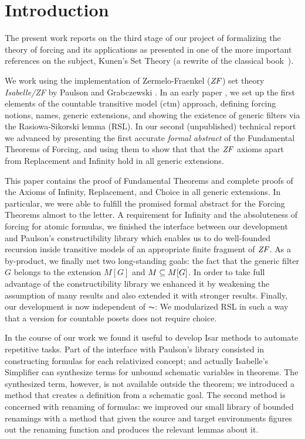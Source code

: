 \section{Introduction}
\label{sec:introduction}

The present work reports on the third stage of our project of
formalizing the theory of forcing and its applications as presented in
one of the more important references on the subject, Kunen's Set
Theory \cite{kunen2011set} (a rewrite of the classical book~\cite{kunen1980}).

We
work using the  implementation of Zermelo-Fraenkel ($\mathit{ZF}$)
set theory \emph{Isabelle/ZF} by Paulson and Grabczewski \cite{DBLP:journals/jar/PaulsonG96}. In
an early paper \cite{2018arXiv180705174G}, we set up the first
elements of the countable transitive model (ctm) approach, defining
forcing notions, names, generic extensions, and
showing the existence of generic filters via the Rasiowa-Sikorski
lemma (RSL). In our second (unpublished) technical report
\cite{2019arXiv190103313G} we advanced by presenting the first accurate
\emph{formal abstract} of the Fundamental Theorems of Forcing, and
using them to show that that the $\mathit{ZF}$ axioms apart from Replacement
and Infinity hold in all generic extensions.

This paper contains the proof of Fundamental Theorems and complete
proofs of the Axioms of Infinity, Replacement, and Choice in all
generic extensions. In particular, we were able to fulfill the
promised formal abstract for the Forcing 
Theorems almost to the letter. A requirement for Infinity and the
absoluteness of forcing for atomic formulas, we finished the interface
between our development and
Paulson's constructibility library \cite{paulson_2003} which enables
us to do well-founded
recursion inside transitive models of an appropriate finite fragment
of $\mathit{ZF}$. As a by-product, we finally met two long-standing goals: the fact that the
generic filter $G$ belongs to the extension $M[G]$ and 
$M\subseteq M[G]$. 
In order to take full advantage of the constructibility library
we enhanced it by weakening the assumption of many results and also
extended it with stronger results. %
Finally, our development is now independent of $\AC$: We modularized
RSL in such a way that a version for countable 
posets does not require choice.

In the course of our work we found it useful to develop Isar methods to
automate repetitive tasks. Part of the interface with Paulson's
library consisted in constructing formulas for each relativized
concept; and actually Isabelle's Simplifier can
synthesize terms for unbound schematic variables in theorems. The
synthesized term, however, is not available outside the theorem; we
introduced a method that creates a definition from a schematic
goal. The second method is concerned with renaming of formulas: we
improved our small library of bounded renamings with a method that
given the source and target environments figures out the renaming
function and produces the relevant lemmas about it.

